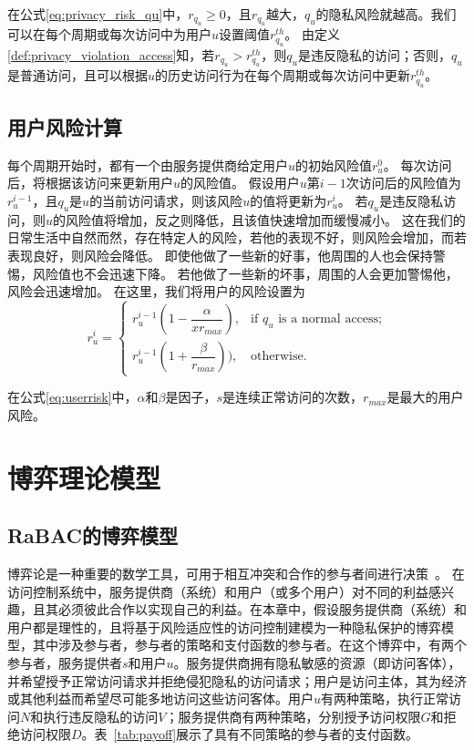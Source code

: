 在公式\ref{eq:privacy_risk_qu}中，$r_{q_u} \geq 0$，且$r_{q_u}$越大，$q_u$的隐私风险就越高。我们可以在每个周期或每次访问中为用户$u$设置阈值$r_{q_u}^{th}$。 由定义\ref{def:privacy_violation_access}知，若$r_{q_u} > r_{q_u}^{th}$，则$q_u$是违反隐私的访问；否则，$q_u$是普通访问，且可以根据$u$的历史访问行为在每个周期或每次访问中更新$r_{q_u}^{th}$。

\subsection{用户风险计算}

每个周期开始时，都有一个由服务提供商给定用户${u}$的初始风险值${r_u ^ 0}$。 每次访问后，将根据该访问来更新用户${u}$的风险值。 假设用户${u}$第${{i-1}}$次访问后的风险值为${r_u ^ {i-1}}$，且${q_u}$是${u}$的当前访问请求，则该风险$ {u}$的值将更新为${r_u ^ {i}}$。 若${q_u}$是违反隐私访问，则${u}$的风险值将增加，反之则降低，且该值快速增加而缓慢减小。 这在我们的日常生活中自然而然，存在特定人的风险，若他的表现不好，则风险会增加，而若表现良好，则风险会降低。 即使他做了一些新的好事，他周围的人也会保持警惕，风险值也不会迅速下降。 若他做了一些新的坏事，周围的人会更加警惕他，风险会迅速增加。 在这里，我们将用户的风险设置为
\begin{equation}\label{eq:userrisk}
r_u^{i}=\left\{ 
\begin{array}{cl}
r_u^{i-1}(1-\dfrac{\alpha}{xr_{max}}), & \text{if } q_u \text{ is a normal access;}\\
r_u^{i-1}(1+\dfrac{\beta}{r_{max}})), & \text{otherwise.}
\end{array}
\right.
\end{equation}

在公式\ref{eq:userrisk}中，$\alpha$和$\beta$是因子，$s$是连续正常访问的次数，$r_{max}$是最大的用户风险。

\section{博弈理论模型}
\label{sec:gamemodel}

\subsection{RaBAC的博弈模型}

博弈论是一种重要的数学工具，可用于相互冲突和合作的参与者间进行决策~\cite{owen2001}。
在访问控制系统中，服务提供商（系统）和用户（或多个用户）对不同的利益感兴趣，且其必须彼此合作以实现自己的利益。在本章中，假设服务提供商（系统）和用户都是理性的，且将基于风险适应性的访问控制建模为一种隐私保护的博弈模型，其中涉及参与者，参与者的策略和支付函数的参与者。在这个博弈中，有两个参与者，服务提供者$s$和用户$u$。服务提供商拥有隐私敏感的资源（即访问客体），并希望授予正常访问请求并拒绝侵犯隐私的访问请求；用户是访问主体，其为经济或其他利益而希望尽可能多地访问这些访问客体。用户$u$有两种策略，执行正常访问$N$和执行违反隐私的访问$V$；服务提供商有两种策略，分别授予访问权限$G$和拒绝访问权限$D$。表~\ref{tab:payoff}展示了具有不同策略的参与者的支付函数。

